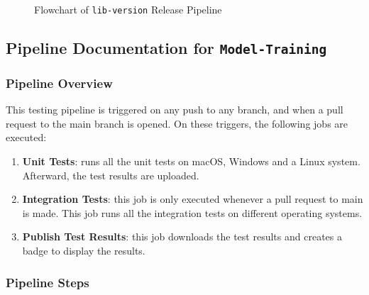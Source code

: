 \begin{figure}[h]
    \caption{Flowchart of \texttt{lib-version} Release Pipeline}
    \label{fig:lib-version-pipeline}
\end{figure}

\subsection{Pipeline Documentation for \texttt{Model-Training}}
\subsubsection{Pipeline Overview}
This testing pipeline is triggered on any push to any branch, and when a pull request to the main branch is opened. On these triggers, the following jobs are executed: 
\begin{enumerate}
    \item \textbf{Unit Tests}: runs all the unit tests on macOS, Windows and a Linux system. Afterward, the test results are uploaded. 
    \item \textbf{Integration Tests}: this job is only executed whenever a pull request to main is made. This job runs all the integration tests on different operating systems. 
    \item \textbf{Publish Test Results}: this job downloads the test results and creates a badge to display the results. 
\end{enumerate}
\subsubsection{Pipeline Steps}
